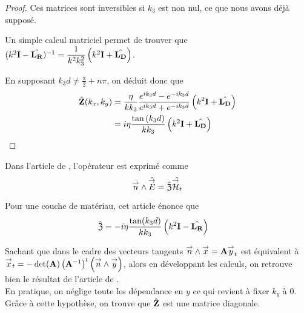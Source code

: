 \begin{proof}
            Ces matrices sont inversibles si \(k_3\) est non nul, ce que nous avons déjà supposé.

            Un simple calcul matriciel permet de trouver que \( (k^2\mathbf{I} - \hat{\mathbf{L_R}})^{-1} = \dfrac{1}{k^2k_3^2}\left(k^2 \mathbf{I} + \hat{\mathbf{L_D}}\right) \).

            En supposant \(k_3d \not = \frac{\pi}{2} + n\pi\), on déduit donc que
            \begin{align}
                \hat {\mathbf{Z}}(k_x,k_y) &= \dfrac{\eta}{kk_3} \dfrac{e^{ik_3d} - e^{-ik_3d}}{e^{ik_3d} + e^{-ik_3d}}\left(k^2\mathbf{I} + \hat{\mathbf{L_D}}\right)
                \\
                &= i\eta\dfrac{\tan\left(k_3d\right)}{kk_3}\left(k^2\mathbf{I} + \hat{\mathbf{L_D}}\right)
            \end{align}

        \end{proof}

        Dans l'article de \cite{marceaux_high-order_2000}, l'opérateur est exprimé comme
        \begin{equation}
            {\overset{\rightarrow}{n}} \wedge \hat{{\overset{\rightarrow}{E}}} = \hat{\mathfrak{Z}} \hat{{\overset{\rightarrow}{\mathcal{H}}}_t}
        \end{equation}

        Pour une couche de matériau, cet article énonce que 
        \begin{align}
            \hat{\mathfrak{Z}} &= -i\eta\dfrac{\tan(k_3d)}{kk_3}\left(k^2\mathbf{I} - \hat{\mathbf{L_R}}\right)
        \end{align}

        Sachant que dans le cadre des vecteurs tangents \({\overset{\rightarrow}{n}}\wedge {\overset{\rightarrow}{x}} = \mathbf{A} {\overset{\rightarrow}{y}}_t\) est équivalent à \({\overset{\rightarrow}{x}}_t = -\det(\mathbf{A})\left(\mathbf{A}^{-1}\right)^t\left({\overset{\rightarrow}{n}}\wedge{\overset{\rightarrow}{y}}\right)\), alors en développant les calculs, on retrouve bien le résultat de l'article de \cite{marceaux_high-order_2000}.\\

        En pratique, on néglige toute les dépendance en \(y\) ce qui revient à fixer \(k_y\) à \(0\). Grâce à cette hypothèse, on trouve que \(\hat {\mathbf{Z}}\) est une matrice diagonale.

